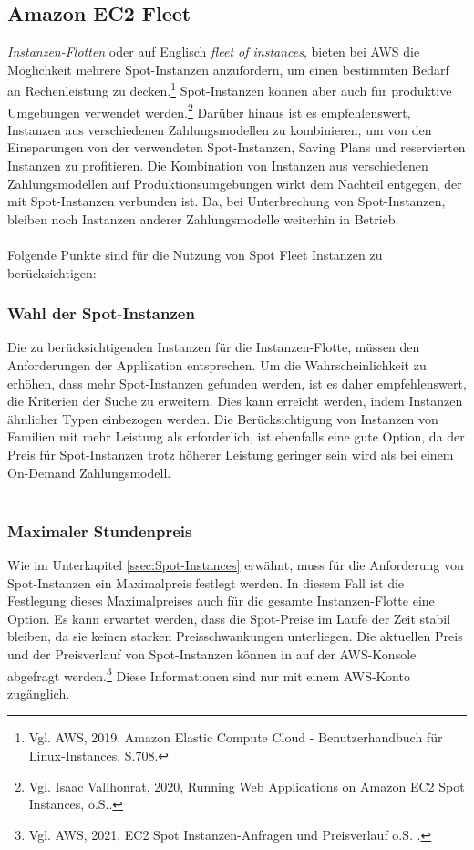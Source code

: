 \subsection{Amazon EC2 Fleet} \label{sssec:AWS-EC2-Fleet}%
\textit{Instanzen-Flotten} oder auf Englisch \textit{fleet of instances}, bieten bei AWS die Möglichkeit mehrere Spot-Instanzen anzufordern, um einen bestimmten Bedarf an Rechenleistung zu decken.\footnote{Vgl. AWS, 2019, Amazon Elastic Compute Cloud - Benutzerhandbuch für Linux-Instances, S.708\cite{AMZ26}.} Spot-Instanzen können aber auch für produktive Umgebungen verwendet werden.\footnote{Vgl. Isaac Vallhonrat, 2020, Running Web Applications on Amazon EC2 Spot Instances, o.S.\cite{AMZ24}.} Darüber hinaus ist es empfehlenswert, Instanzen aus verschiedenen Zahlungsmodellen zu kombinieren, um von den Einsparungen von der verwendeten Spot-Instanzen, Saving Plans und reservierten Instanzen zu profitieren. Die Kombination von Instanzen aus verschiedenen Zahlungsmodellen auf Produktionsumgebungen wirkt dem Nachteil entgegen, der mit Spot-Instanzen verbunden ist. Da, bei Unterbrechung von Spot-Instanzen, bleiben noch Instanzen anderer Zahlungsmodelle weiterhin in Betrieb.
\\\\
Folgende Punkte sind für die Nutzung von Spot Fleet Instanzen zu berücksichtigen:
\subsubsection*{Wahl der Spot-Instanzen}
Die zu berücksichtigenden Instanzen für die Instanzen-Flotte, müssen den Anforderungen der %
Applikation entsprechen. Um die Wahrscheinlichkeit zu erhöhen, dass mehr Spot-Instanzen gefunden werden, ist es daher empfehlenswert, die Kriterien der Suche zu erweitern. Dies kann erreicht werden, indem Instanzen ähnlicher Typen einbezogen werden. Die Berücksichtigung von Instanzen von Familien mit mehr Leistung als erforderlich, ist ebenfalls eine gute Option\cite{AMZ24}, da der Preis für Spot-Instanzen trotz höherer Leistung geringer sein wird als bei einem On-Demand Zahlungsmodell.
\\\\
\subsubsection*{Maximaler Stundenpreis}
Wie im Unterkapitel \ref{ssec:Spot-Instances} erwähnt, muss für die Anforderung von Spot-Instanzen ein Maximalpreis festlegt werden. In diesem Fall ist die Festlegung dieses Maximalpreises auch für die gesamte Instanzen-Flotte eine Option. Es kann erwartet werden, dass die Spot-Preise im Laufe der Zeit stabil bleiben, da sie keinen starken Preisschwankungen unterliegen. Die aktuellen Preis und der Preisverlauf von Spot-Instanzen können in auf der AWS-Konsole abgefragt werden.\footnote{Vgl. AWS, 2021, EC2 Spot Instanzen-Anfragen und Preisverlauf o.S. \cite{AMZ25}.} Diese Informationen sind nur mit einem AWS-Konto zugänglich.

